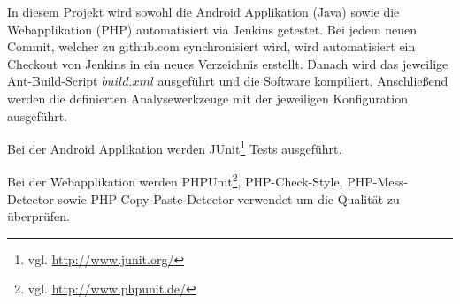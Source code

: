 In diesem Projekt wird sowohl die Android Applikation (Java) sowie die
	Webapplikation (PHP) automatisiert via Jenkins getestet. Bei jedem neuen
	Commit, welcher zu github.com synchronisiert wird, wird automatisiert
	ein Checkout von Jenkins in ein neues Verzeichnis erstellt. Danach
	wird das jeweilige Ant-Build-Script $build.xml$ ausgeführt und die
	Software kompiliert. Anschließend werden die definierten
	Analysewerkzeuge mit der jeweiligen Konfiguration ausgeführt.
	
Bei der Android Applikation werden JUnit\footnote{vgl.
	\url{http://www.junit.org/}} Tests ausgeführt.
	
Bei der Webapplikation werden PHPUnit\footnote{vgl.
	\url{http://www.phpunit.de/}}, PHP-Check-Style, PHP-Mess-Detector sowie
	PHP-Copy-Paste-Detector verwendet um die Qualität zu überprüfen.
	

